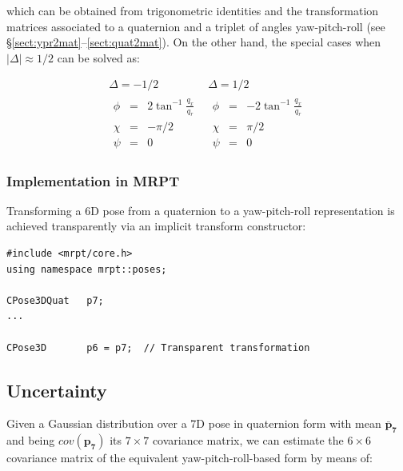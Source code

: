 \documentclass[a4paper,10pt]{report}
\begin{document}
\noindent which can be obtained from trigonometric identities and 
the transformation matrices associated to a quaternion and a triplet of angles yaw-pitch-roll 
(see \S \ref{sect:ypr2mat}--\ref{sect:quat2mat}).
On the other hand, the special cases when $|\Delta| \approx 1/2$ can be solved as:

\begin{equation}
\begin{array}{c|c}
  \Delta = -1/2 & \Delta = 1/2 \\ \hline
  \begin{array}{rcl}
    \phi &=& 2 \tan^{-1} \frac{q_x}{q_r} \\
    \chi &=& -\pi /2 \\
    \psi &=& 0
  \end{array} 
&
  \begin{array}{rcl}
    \phi &=& -2 \tan^{-1} \frac{q_x}{q_r} \\
    \chi &=& \pi /2 \\
    \psi &=& 0
  \end{array} 
\end{array}
\label{eq:quat2ypr_2}
\end{equation}


\subsubsection{Implementation in MRPT}

Transforming a 6D pose from a quaternion to a yaw-pitch-roll representation is 
achieved transparently via an implicit transform constructor:

\begin{lstlisting}
#include <mrpt/core.h> 
using namespace mrpt::poses; 

CPose3DQuat   p7;
...

CPose3D       p6 = p7;  // Transparent transformation
\end{lstlisting}



\subsection{Uncertainty}

Given a Gaussian distribution over a 7D pose in quaternion form with 
mean ${\mathbf{\bar{p}_7}}$ and being $cov(\mathbf{p_7})$ its $7 \times 7$ covariance matrix, 
we can estimate the $6 \times 6$ covariance matrix of the equivalent yaw-pitch-roll-based 
form by means of:
\end{document}

